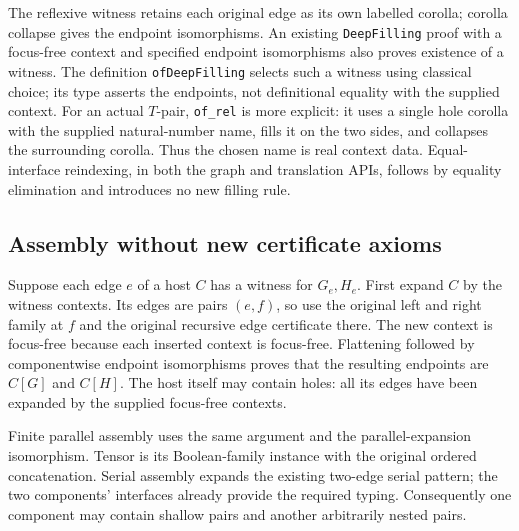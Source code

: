 The reflexive witness retains each original edge as its own labelled corolla;
corolla collapse gives the endpoint isomorphisms. An existing
\texttt{DeepFilling} proof with a focus-free context and specified endpoint
isomorphisms also proves existence of a witness. The definition
\texttt{ofDeepFilling} selects such a witness using classical choice; its type
asserts the endpoints, not definitional equality with the supplied context.
For an actual $T$-pair, \texttt{of\_rel} is more explicit: it uses a single
hole corolla with the supplied natural-number name, fills it on the two sides,
and collapses the surrounding corolla. Thus the chosen name is real context
data. Equal-interface reindexing, in both the graph and translation APIs,
follows by equality elimination and introduces no new filling rule.


\subsection{Assembly without new certificate axioms}
Suppose each edge $e$ of a host $C$ has a witness for $G_e,H_e$. First expand
$C$ by the witness contexts. Its edges are pairs $(e,f)$, so use the original
left and right family at $f$ and the original recursive edge certificate there.
The new context is focus-free because each inserted context is focus-free.
Flattening followed by componentwise endpoint isomorphisms proves that the
resulting endpoints are $C[G]$ and $C[H]$. The host itself may contain holes:
all its edges have been expanded by the supplied focus-free contexts.


Finite parallel assembly uses the same argument and the parallel-expansion
isomorphism. Tensor is its Boolean-family instance with the original ordered
concatenation. Serial assembly expands the existing two-edge serial pattern;
the two components' interfaces already provide the required typing. Consequently
one component may contain shallow pairs and another arbitrarily nested pairs.


